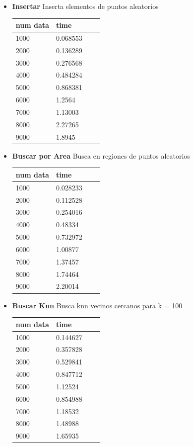 \documentclass[a4paper]{article}
\begin{document}
\begin{itemize}
    \item \textbf{Insertar} Inserta elementos  de puntos aleatorios
    
    \begin{tabular}{ |p{3cm}||p{3cm}|p{3cm}|p{3cm}|  }
     \hline
     num data & time\\
     \hline
     1000 & 0.068553  \\
     2000 & 0.136289  \\
     3000 & 0.276568  \\
     4000 & 0.484284  \\
     5000 & 0.868381  \\
     6000 & 1.2564  \\
     7000 & 1.13003  \\
     8000 & 2.27265  \\
     9000 & 1.8945  \\
     \hline
    \end{tabular}
    
    \item \textbf{Buscar por Area} Busca en regiones de puntos aleatorios
    
    \begin{tabular}{ |p{3cm}||p{3cm}|p{3cm}|p{3cm}|  }
     \hline
     num data & time\\
     \hline
     1000 & 0.028233  \\
     2000 & 0.112528  \\
     3000 & 0.254016  \\
     4000 & 0.48334  \\
     5000 & 0.732972  \\
     6000 & 1.00877  \\
     7000 & 1.37457  \\
     8000 & 1.74464  \\
     9000 & 2.20014  \\
     \hline
    \end{tabular}
    
    
    \item \textbf{Buscar Knn} Busca knn vecinos cercanos para k = 100
    
    \begin{tabular}{ |p{3cm}||p{3cm}|p{3cm}|p{3cm}|  }
     \hline
     num data & time\\
     \hline
     1000 & 0.144627  \\
     2000 & 0.357828  \\
     3000 & 0.529841  \\
     4000 & 0.847712  \\
     5000 & 1.12524  \\
     6000 & 0.854988  \\
     7000 & 1.18532  \\
     8000 & 1.48988  \\
     9000 & 1.65935  \\
     \hline
    \end{tabular}
\end{itemize}
\end{document}
